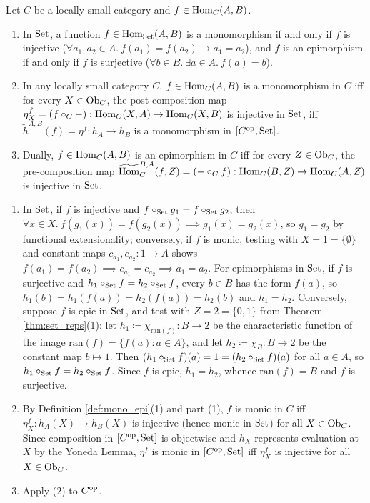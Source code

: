 \documentclass[10pt,a4paper]{article}
\begin{document}
\begin{theorem}\label{thm:mono_epi_yoneda}
Let $C$ be a locally small category and $f \in {\textrm{Hom}}_C(A, B)$.
\begin{enumerate}
\item In ${\textrm{Set}}$, a function $f \in {\textrm{Hom}}_{\textrm{Set}}(A, B)$ is a monomorphism if and only if $f$ is injective ($\forall a_1, a_2 \in A.\ f(a_1) = f(a_2) \to a_1 = a_2$), and $f$ is an epimorphism if and only if $f$ is surjective ($\forall b \in B.\ \exists a \in A.\ f(a) = b$).
\item In any locally small category $C$, $f \in {\textrm{Hom}}_C(A, B)$ is a monomorphism in $C$ iff for every $X \in {\textrm{Ob}}_C$, the post-composition map $\eta^f_X = (f \circ_C -) : {\textrm{Hom}}_C(X, A) \to {\textrm{Hom}}_C(X, B)$ is injective in ${\textrm{Set}}$, iff $\widetilde{h}^{A,B}(f) = \eta^f : h_A \to h_B$ is a monomorphism in $[C^{\textrm{op}}, {\textrm{Set}}]$.
\item Dually, $f \in {\textrm{Hom}}_C(A, B)$ is an epimorphism in $C$ iff for every $Z \in {\textrm{Ob}}_C$, the pre-composition map ${\widetilde{{\textrm{Hom}}}\textrm{}}_C^{B,A}(f, Z) = (- \circ_C f) : {\textrm{Hom}}_C(B, Z) \to {\textrm{Hom}}_C(A, Z)$ is injective in ${\textrm{Set}}$.
\end{enumerate}
\end{theorem}
\myprf
\begin{enumerate}
\item In ${\textrm{Set}}$, if $f$ is injective and $f \circ_{\textrm{Set}} g_1 = f \circ_{\textrm{Set}} g_2$, then $\forall x \in X.\ f(g_1(x)) = f(g_2(x)) \implies g_1(x) = g_2(x)$, so $g_1 = g_2$ by functional extensionality; conversely, if $f$ is monic, testing with $X = 1 = \{\emptyset\}$ and constant maps $c_{a_1}, c_{a_2} : 1 \to A$ shows $f(a_1) = f(a_2) \implies c_{a_1} = c_{a_2} \implies a_1 = a_2$. For epimorphisms in ${\textrm{Set}}$, if $f$ is surjective and $h_1 \circ_{\textrm{Set}} f = h_2 \circ_{\textrm{Set}} f$, every $b \in B$ has the form $f(a)$, so $h_1(b) = h_1(f(a)) = h_2(f(a)) = h_2(b)$ and $h_1 = h_2$. Conversely, suppose $f$ is epic in ${\textrm{Set}}$, and test with $Z = 2 = \{0, 1\}$ from Theorem \ref{thm:set_reps}(1): let $h_1 \coloneqq \chi_{\textrm{ran}(f)} : B \to 2$ be the characteristic function of the image $\textrm{ran}(f) = \{f(a) : a \in A\}$, and let $h_2 \coloneqq \chi_B : B \to 2$ be the constant map $b \mapsto 1$. Then $(h_1 \circ_{\textrm{Set}} f)(a) = 1 = (h_2 \circ_{\textrm{Set}} f)(a)$ for all $a \in A$, so $h_1 \circ_{\textrm{Set}} f = h_2 \circ_{\textrm{Set}} f$. Since $f$ is epic, $h_1 = h_2$, whence $\textrm{ran}(f) = B$ and $f$ is surjective.
\item By Definition \ref{def:mono_epi}(1) and part (1), $f$ is monic in $C$ iff $\eta^f_X : h_A(X) \to h_B(X)$ is injective (hence monic in ${\textrm{Set}}$) for all $X \in {\textrm{Ob}}_C$. Since composition in $[C^{\textrm{op}}, {\textrm{Set}}]$ is objectwise and $h_X$ represents evaluation at $X$ by the Yoneda Lemma, $\eta^f$ is monic in $[C^{\textrm{op}}, {\textrm{Set}}]$ iff $\eta^f_X$ is injective for all $X \in {\textrm{Ob}}_C$.
\item Apply (2) to $C^{\textrm{op}}$.
\end{enumerate}
\myqed
\end{document}
